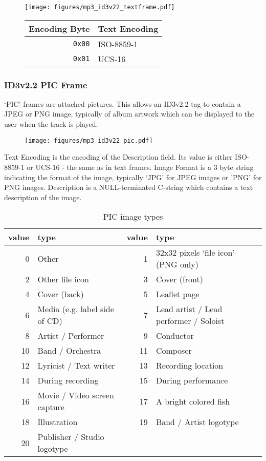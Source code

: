 \pagebreak

\begin{figure}[h]
\texttt{[image: figures/mp3\_id3v22\_textframe.pdf]}
\begin{tabular}{r|l}
Encoding Byte & Text Encoding \\
\hline
\texttt{0x00} & ISO-8859-1 \\
\texttt{0x01} & UCS-16 \\
\end{tabular}
\end{figure}

\subsubsection{ID3v2.2 PIC Frame}

`PIC' frames are attached pictures.
This allows an ID3v2.2 tag to contain a JPEG or PNG image,
typically of album artwork which can be displayed to the user
when the track is played.

\begin{figure}[h]
\texttt{[image: figures/mp3\_id3v22\_pic.pdf]}
\end{figure}
\par
\noindent
Text Encoding is the encoding of the Description field.
Its value is either ISO-8859-1 or UCS-16 - the same as in
text frames.
Image Format is a 3 byte string indicating the format of the image,
typically `JPG' for JPEG images or 'PNG' for PNG images.
Description is a NULL-terminated C-string which contains
a text description of the image.

\begin{table}[h]
{
\begin{tabular}{|r|l||r|l|}
\hline
value & type & value & type \\
\hline
0 & Other & 1 & 32x32 pixels `file icon' (PNG only) \\
2 & Other file icon & 3 & Cover (front) \\
4 & Cover (back) & 5 & Leaflet page \\
6 & Media (e.g. label side of CD) & 7 & Lead artist / Lead performer / Soloist \\
8 & Artist / Performer & 9 & Conductor \\
10 & Band / Orchestra & 11 & Composer \\
12 & Lyricist / Text writer & 13 & Recording location \\
14 & During recording & 15 & During performance \\
16 & Movie / Video screen capture & 17 & A bright colored fish \\
18 & Illustration & 19 & Band / Artist logotype \\
20 & Publisher / Studio logotype & &  \\
\hline
\end{tabular}
\caption{PIC image types}
}
\end{table}

